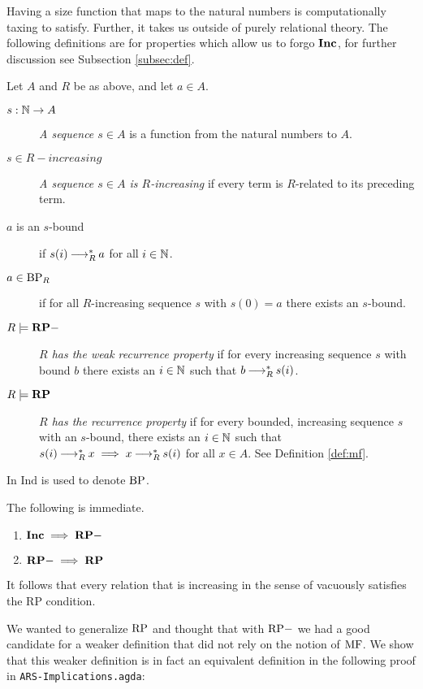 Having a size function that maps to the natural numbers is computationally taxing to satisfy.
Further, it takes us outside of purely relational theory. The following definitions are for properties which allow us to forgo $\mathbf{Inc}$, for further discussion see Subsection \ref{subsec:def}.
\begin{definition} \label{def:rp} Let $A$ and $R$ be as above, and let $a \in A$.
    \begin{description}
        \item[$s : \mathbb{N} \to A$] \emph{A sequence $s \in A$} is a function from the natural numbers to $A$.
        \item[$s \in R-increasing$] \emph{A sequence $s \in A$ is $R$-increasing} if every term is $R$-related to its preceding term.
        \item[$a$ is an $s$-bound] if $s (i) \mathbin{\longrightarrow_R^*} a$ for all $i \in \mathbb{N}$.
        \item[$a \in \mathrm{BP}_R$] if for all $R$-increasing sequence $s$ with $s (0) = a$ there exists an $s$-bound.
        \item[$R \models \mathbf{RP-}$] \emph{$R$ has the weak recurrence property} if for every increasing sequence $s$ with bound $b$ there exists an $i \in \mathbb{N}$ such that $b \mathbin{\longrightarrow_R^*} s (i)$.
        \item[$R \models \mathbf{RP}$] \emph{$R$ has the recurrence property} if for every bounded, increasing sequence $s$ with an $s$-bound, there exists an $i \in \mathbb{N}$ such that
        $s (i) \mathbin{\longrightarrow_R^*} x \implies x \mathbin{\longrightarrow_R^*} s (i)$ for all $x\in A$. See Definition \ref{def:mf}.
    \end{description}
\end{definition}

In \terese $\mathrm{Ind}$ is used to denote $\mathrm{BP}$.

The following is immediate.
\begin{proposition}\hfill
    \begin{enumerate}
        \item $\mathbf{Inc} \implies \mathbf{RP-}$
        \item $\mathbf{RP-} \implies \mathbf{RP}$
    \end{enumerate}
\end{proposition}


It follows that every relation that is increasing in the sense of \terese
vacuously satisfies the RP condition.

We wanted to generalize $\mathrm{RP}$ and thought that with $\mathrm{RP-}$ we had a good candidate for a weaker definition that
did not rely on the notion of $\mathrm{MF}$. We show that this weaker definition is
in fact an equivalent definition in the following proof in \texttt{ARS-Implications.agda}:

